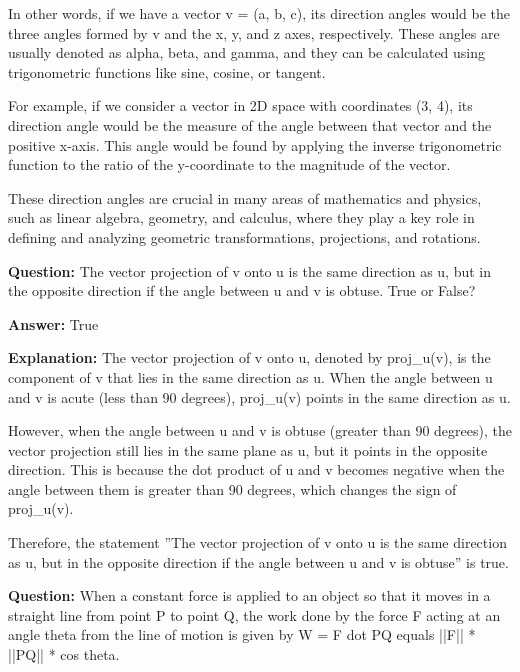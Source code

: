 \documentclass{article}
\begin{document}
In other words, if we have a vector v = (a, b, c), its direction angles would be the three angles formed by v and the x, y, and z axes, respectively. These angles are usually denoted as alpha, beta, and gamma, and they can be calculated using trigonometric functions like sine, cosine, or tangent.

For example, if we consider a vector in 2D space with coordinates (3, 4), its direction angle would be the measure of the angle between that vector and the positive x-axis. This angle would be found by applying the inverse trigonometric function to the ratio of the y-coordinate to the magnitude of the vector.

These direction angles are crucial in many areas of mathematics and physics, such as linear algebra, geometry, and calculus, where they play a key role in defining and analyzing geometric transformations, projections, and rotations.
                
                \vspace{0.5cm} 
        
            
                \textbf {Question:} The vector projection of v onto u is the same direction as u, but in the opposite direction if the angle between u and v is obtuse. True or False?
                
                \textbf{Answer:} True

                \textbf{Explanation:} The vector projection of v onto u, denoted by proj\_u(v), is the component of v that lies in the same direction as u. When the angle between u and v is acute (less than 90 degrees), proj\_u(v) points in the same direction as u.

However, when the angle between u and v is obtuse (greater than 90 degrees), the vector projection still lies in the same plane as u, but it points in the opposite direction. This is because the dot product of u and v becomes negative when the angle between them is greater than 90 degrees, which changes the sign of proj\_u(v).

Therefore, the statement ''The vector projection of v onto u is the same direction as u, but in the opposite direction if the angle between u and v is obtuse'' is true.
                
                \vspace{0.5cm} 
        
            
                \textbf {Question:} When a constant force is applied to an object so that it moves in a straight line from point P to point Q, the work done by the force F acting at an angle theta from the line of motion is given by W = F dot PQ equals ||F|| * ||PQ|| * cos theta.
                
\end{document}
